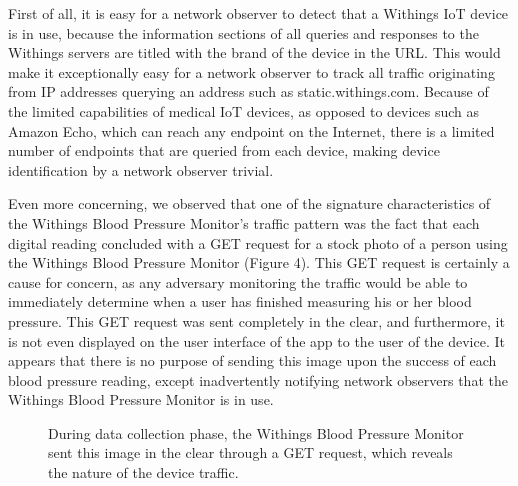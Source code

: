 First of all, it is easy for a network observer to detect that a Withings IoT
device is in use, because the information sections of all queries and
responses to the Withings servers are titled with the brand of the device in
the URL. This would make it exceptionally easy for a network observer to track
all traffic originating from IP addresses querying an address such as
static.withings.com. Because of the limited capabilities of medical IoT
devices, as opposed to devices such as Amazon Echo, which can reach any
endpoint on the Internet, there is a limited number of endpoints that are
queried from each device, making device identification by a network observer
trivial.

Even more concerning, we observed that one of the signature characteristics of
the Withings Blood Pressure Monitor's traffic pattern was the fact that each
digital reading concluded with a GET request for a stock photo of a person
using the Withings Blood Pressure Monitor (Figure 4). This GET request is
certainly a cause for concern, as any adversary monitoring the traffic would
be able to immediately determine when a user has finished measuring his or her
blood pressure. This GET request was sent completely in the clear, and
furthermore, it is not even displayed on the user interface of the app to the
user of the device. It appears that there is no purpose of sending this image
upon the success of each blood pressure reading, except inadvertently
notifying network observers that the Withings Blood Pressure Monitor is in
use.

\begin{figure}[t]
  \centering
     \caption{During data collection phase, the Withings Blood Pressure Monitor sent this image in the clear through a GET request, which reveals the nature of the device traffic.}
     \label{fig:bp-image}
\end{figure}

